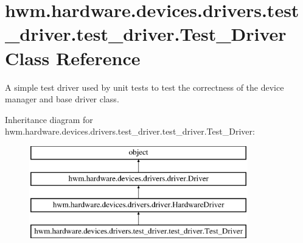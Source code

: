 \hypertarget{classhwm_1_1hardware_1_1devices_1_1drivers_1_1test__driver_1_1test__driver_1_1_test___driver}{\section{hwm.\-hardware.\-devices.\-drivers.\-test\-\_\-driver.\-test\-\_\-driver.\-Test\-\_\-\-Driver Class Reference}
\label{classhwm_1_1hardware_1_1devices_1_1drivers_1_1test__driver_1_1test__driver_1_1_test___driver}
}


A simple test driver used by unit tests to test the correctness of the device manager and base driver class.  


Inheritance diagram for hwm.\-hardware.\-devices.\-drivers.\-test\-\_\-driver.\-test\-\_\-driver.\-Test\-\_\-\-Driver\-:\begin{figure}[H]
\begin{center}
\leavevmode
\includegraphics[height=4.000000cm]{classhwm_1_1hardware_1_1devices_1_1drivers_1_1test__driver_1_1test__driver_1_1_test___driver}
\end{center}
\end{figure}
